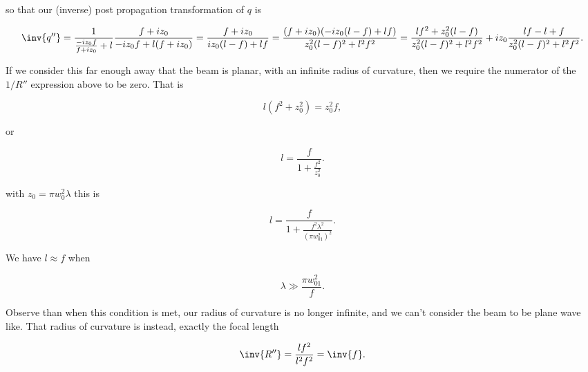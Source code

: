 {so that our (inverse) post propagation transformation of $q$ is

\begin{dmath}\label{eqn:problemSet4Problem1:400}
\inv{q''} = 
\frac{1}{
\frac{-i z_0 f}{f + i z_0} 
+ l
}
\frac{f + i z_0}{
-i z_0 f + l (f + i z_0)
}
=
\frac{f + i z_0}{
i z_0 ( l - f ) + l f
}
=
\frac{(f + i z_0)(
-i z_0 ( l - f ) + l f
)}{
z_0^2 ( l - f )^2 + l^2 f^2
}
=
\frac{
l f^2 + z_0^2 ( l - f) 
}{
z_0^2 ( l - f )^2 + l^2 f^2
}
+
i z_0
\frac{
l f - l + f
}{
z_0^2 ( l - f )^2 + l^2 f^2
}.
\end{dmath}

If we consider this far enough away that the beam is planar, with an infinite radius of curvature, then we require the numerator of the $1/R''$ expression above to be zero.  That is

\begin{dmath}\label{eqn:problemSet4Problem1:420}
l ( f^2 + z_0^2 ) = z_0^2 f,
\end{dmath}

or

\begin{dmath}\label{eqn:problemSet4Problem1:440}
l 
= \frac{f}{1 + \frac{f^2}{z_0^2} }.
\end{dmath}

with $z_0 = \pi w_0^2 \lambda$ this is

\begin{dmath}\label{eqn:problemSet4Problem1:460}
\boxed{
l 
= \frac{f}{1 + \frac{f^2 \lambda^2}{\left(\pi w_{01}^2\right)^2} }.
}
\end{dmath}

We have $l \approx f$ when

\begin{dmath}\label{eqn:problemSet4Problem1:480}
\boxed{
\lambda \gg \frac{\pi w_{01}^2}{f}.
}
\end{dmath}

Observe than when this condition is met, our radius of curvature is no longer infinite, and we can't consider the beam to be plane wave like.  That radius of curvature is instead, exactly the focal length

\begin{dmath}\label{eqn:problemSet4Problem1:500}
\inv{R''} = \frac{l f^2}{ l^2 f^2} = \inv{f}.
\end{dmath}
}

